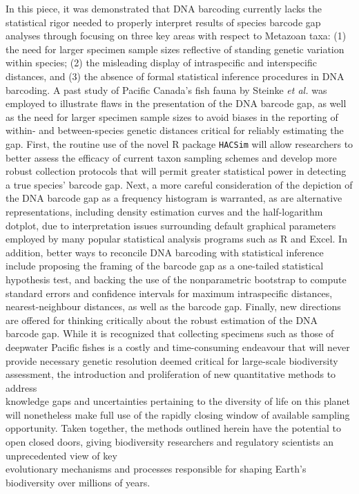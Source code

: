 In this piece, it was demonstrated that DNA barcoding currently lacks the \\ statistical rigor needed to properly interpret results of species barcode gap analyses through focusing on three key areas with respect to Metazoan taxa: (1) the need for larger specimen sample sizes reflective of standing genetic variation within species; (2) the misleading display of intraspecific and interspecific distances, and (3) the absence of formal statistical inference procedures in DNA barcoding. A past study of Pacific Canada's fish fauna by Steinke \textit{et al.} \cite{steinke2009dna} was employed to illustrate flaws in the presentation of the DNA barcode gap, as well as the need for larger specimen sample sizes to avoid biases in the reporting of within- and between-species genetic distances critical for reliably estimating the gap. First, the routine use of the novel R package {\tt HACSim} will allow researchers to better assess the efficacy of current taxon sampling schemes and develop more robust collection protocols that will permit greater statistical power in detecting a true species' barcode gap. Next, a more careful consideration of the depiction of the DNA barcode gap as a frequency histogram is warranted, as are alternative representations, including density estimation curves and the half-logarithm dotplot, due to interpretation issues surrounding default graphical parameters employed by many popular statistical analysis programs such as R and Excel. In addition, better ways to reconcile DNA barcoding with statistical inference include proposing the framing of the barcode gap as a one-tailed statistical hypothesis test, and backing the use of the nonparametric bootstrap to compute standard errors and confidence intervals for maximum intraspecific distances, nearest-neighbour distances, as well as the barcode gap. Finally, new directions are offered for thinking critically about the robust estimation of the DNA barcode gap. While it is recognized that collecting specimens such as those of deepwater Pacific fishes is a costly and time-consuming endeavour that will never provide necessary genetic resolution deemed critical for large-scale biodiversity assessment, the introduction and proliferation of new quantitative methods to address \\ knowledge gaps and uncertainties pertaining to the diversity of life on this planet will nonetheless make full use of the rapidly closing window of available sampling opportunity. Taken together, the methods outlined herein have the potential to open closed doors, giving biodiversity researchers and regulatory scientists an unprecedented view of key \\ evolutionary 
mechanisms and processes responsible for shaping Earth's biodiversity over millions of years.



